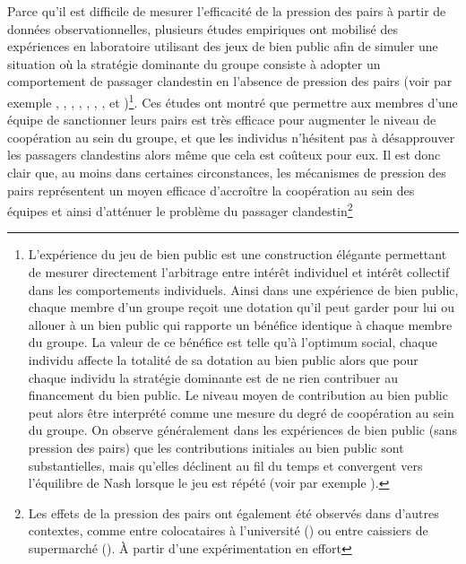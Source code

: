 \begin{Article}
\begin{refsection}[Lebourges]
Parce qu'il est difficile de mesurer l'efficacité de la pression des
pairs à partir de données observationnelles, plusieurs études empiriques
ont mobilisé des expériences en laboratoire utilisant des jeux de bien
public afin de simuler une situation où la stratégie dominante du groupe
consiste à adopter un comportement de passager clandestin en l'absence
de pression des pairs (voir par exemple \textcite{Yamagishi1986}, \textcite{FehrGächter2000}, \textcite{MascletNoussairTuckerVilleval2003}, \textcite{CarpenterMatthewsOngOnga2004}, \textcite{BochetPagePutterman2006}, \textcite{NoussairTucker2005}, \textcite{SeftonShuppWalker2007}, \textcite{CarpenterBowlesGintisHwang2009} et \textcite{GrossePuttermanRockenbach2011})\footnote{L'expérience du jeu de bien public est une
  construction élégante permettant de mesurer directement l'arbitrage
  entre intérêt individuel et intérêt collectif dans les comportements
  individuels. Ainsi dans une expérience de bien public, chaque membre
  d'un groupe reçoit une dotation qu'il peut garder pour lui ou allouer
  à un bien public qui rapporte un bénéfice identique à chaque membre du
  groupe. La valeur de ce bénéfice est telle qu'à l'optimum social,
  chaque individu affecte la totalité de sa dotation au bien public
  alors que pour chaque individu la stratégie dominante est de ne rien
  contribuer au financement du bien public. Le niveau moyen de
  contribution au bien public peut alors être interprété comme une
  mesure du degré de coopération au sein du groupe. On observe
  généralement dans les expériences de bien public (sans pression des
  pairs) que les contributions initiales au bien public sont
  substantielles, mais qu'elles déclinent au fil du temps et convergent
  vers l'équilibre de Nash lorsque le jeu est répété (voir par exemple
  \textcite{Ledyard1995}).}. Ces études ont montré que permettre aux membres
d'une équipe de sanctionner leurs pairs est très efficace pour augmenter
le niveau de coopération au sein du groupe, et que les individus
n'hésitent pas à désapprouver les passagers clandestins alors même que
cela est coûteux pour eux. Il est donc clair que, au moins dans
certaines circonstances, les mécanismes de pression des pairs
représentent un moyen efficace d'accroître la coopération au sein des
équipes et ainsi d'atténuer le problème du passager
clandestin\footnote{Les effets de la pression des pairs ont également
  été observés dans d'autres contextes, comme entre colocataires à
  l'université (\textcite{Sacerdote2001}) ou entre caissiers de supermarché
  (\textcite{MasMoretti2009}). À partir d'une expérimentation en effort
}
\end{refsection}
\end{Article}
